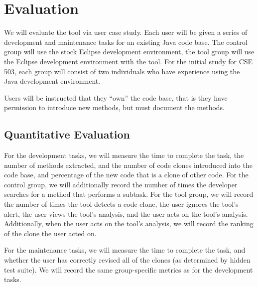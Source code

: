 \documentclass[preprint,10pt]{sigplanconf}
\begin{document}
\section{Evaluation}


We will evaluate the tool via user case study. Each user will be given
a series of development and maintenance tasks for an existing Java
code base. The control group will use the stock Eclipse development
environment, the tool group will use the Eclipse development
environment with the tool. For the initial study for CSE 503, each
group will consist of two individuals who have experience using the
Java development environment.

Users will be instructed that they ``own'' the code base, that is they
have permission to introduce new methods, but must document the
methods.

\subsection{Quantitative Evaluation}
For the development tasks, we will measure the time to complete the
task, the number of methods extracted, and the number of code clones
introduced into the code base, and percentage of the new code that is
a clone of other code. For the control group, we will additionally
record the number of times the developer searches for a method that
performs a subtask. For the tool group, we will record the number of
times the tool detects a code clone, the user ignores the tool's
alert, the user views the tool's analysis, and the user acts on the
tool's analysis. Additionally, when the user acts on the tool's
analysis, we will record the ranking of the clone the user acted on.

For the maintenance tasks, we will measure the time to complete the
task, and whether the user has correctly revised all of the clones (as
determined by hidden test suite). We will record the same
group-specific metrics as for the development tasks.
\end{document}
